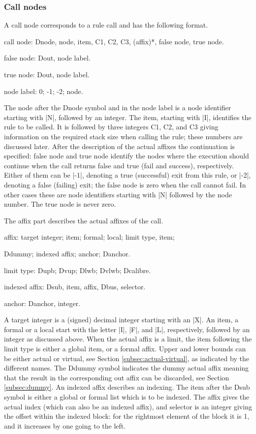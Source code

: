 \documentclass[titlepage]{article}
\newenvironment{grammar}{%
\begin{list}{}{%
\setlength\leftmargin{18pt}%
\setlength\rightmargin{-5pt}%
\setlength\listparindent{20pt}%
\setlength\itemsep{1pt plus0.2ex}%
\setlength\parsep{0pt plus 2pt}%
\setlength\labelsep{-5pt}%
}\color{blue!90!black}\sf\mkoptions%
}{\end{list}}
\newcommand\g[1]{\textsf{\color{blue!90!black}#1}}
\begin{document}
\subsubsection{Call nodes}
A call node  corresponds to a rule call and has the following format.
\begin{grammar}
\item call node: Dnode, node, item, C1, C2, C3, (affix)*, false node,
true node.
\item false node: Dout, node label.
\item true node: Dout, node label.
\item node label: 0; -1; -2; node.
\end{grammar}
\noindent
The \g{node} after the \g{Dnode} symbol and in the \g{node label} is a node 
identifier starting with \pp|N|, followed by an integer. The \g{item}, 
starting with \pp|I|, identifies the rule to be called. It is followed by
three integers \g{C1}, \g{C2}, and \g{C3} giving information on the required
stack size when calling the rule; these numbers are discussed later. After the 
description of the actual affixes the continuation is specified:
\g{false node} and \g{true node} identify the nodes where the
execution should continue when the call returns false and true (fail and
success), respectively.
Either of them can be \pp|-1|, denoting a true (successful) exit from this
rule, or \pp|-2|, denoting a false (failing) exit; the \g{false node} is
zero when the call cannot fail.
In other cases these are node identifiers starting with \pp|N| followed by 
the node number. The \g{true node} is never zero.

The \g{affix} part describes the actual affixes of the call.
\begin{grammar}
\item affix: target integer; item; formal; local; limit type, item;

   Ddummy; indexed affix; anchor; Danchor.
\item limit type: Dupb; Dvup; Dlwb; Dvlwb; Dcalibre.
\item indexed affix: Dsub, item, affix, Dbus, selector.
\item anchor: Danchor, integer.
\end{grammar}
A \g{target integer} is a (signed) decimal integer starting with an \pp|X|.
An \g{item}, a \g{formal} or a \g{local} start with the letter \pp|I|,
\pp|F|, and \pp|L|, respectively, followed by an integer as discussed above.
When the actual affix is a limit, the \g{item} following the \g{limit type}
is either a global \g{item}, or a \g{formal} affix. Upper and lower bounds
can be either actual or virtual, see Section \ref{subsec:actual-virtual}, as
indicated by the different names.
The \g{Ddummy} symbol indicates the \g{dummy} actual affix meaning that the
result in the corresponding out affix can be discarded, see Section
\ref{subsec:dummy}. An \g{indexed affix} describes an indexing. The \g{item}
after the \g{Dsub} symbol is either a global or formal list which is to be
indexed. The \g{affix} gives the actual index (which can also be an indexed
affix), and \g{selector} is an integer giving the offset within the indexed
block: for the rightmost element of the block it is 1, and it increases by
one going to the left.
\end{document}
